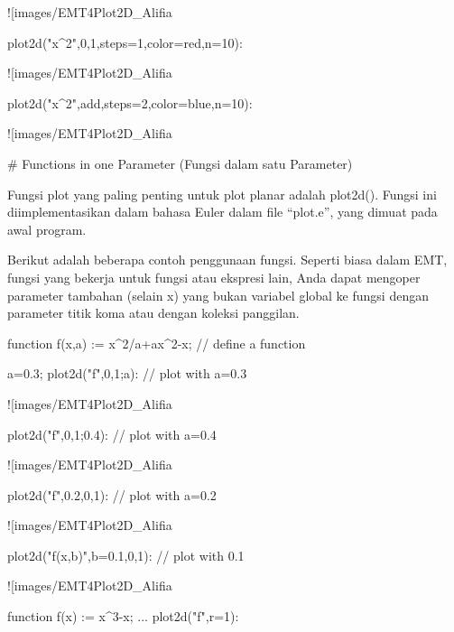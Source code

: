 \documentclass{article}
\begin{document}
![images/EMT4Plot2D_Alifia%

\>plot2d("x^2",0,1,steps=1,color=red,n=10):


![images/EMT4Plot2D_Alifia%

\>plot2d("x^2",\>add,steps=2,color=blue,n=10):


![images/EMT4Plot2D_Alifia%

# Functions in one Parameter (Fungsi dalam satu Parameter)

Fungsi plot yang paling penting untuk plot planar adalah plot2d().
Fungsi ini diimplementasikan dalam bahasa Euler dalam file “plot.e”,
yang dimuat pada awal program.


Berikut adalah beberapa contoh penggunaan fungsi. Seperti biasa dalam
EMT, fungsi yang bekerja untuk fungsi atau ekspresi lain, Anda dapat
mengoper parameter tambahan (selain x) yang bukan variabel global ke
fungsi dengan parameter titik koma atau dengan koleksi panggilan.


\>function f(x,a) := x^2/a+a\*x^2-x; // define a function

\>a=0.3; plot2d("f",0,1;a): // plot with a=0.3


![images/EMT4Plot2D_Alifia%

\>plot2d("f",0,1;0.4): // plot with a=0.4


![images/EMT4Plot2D_Alifia%

\>plot2d({{"f",0.2}},0,1): // plot with a=0.2


![images/EMT4Plot2D_Alifia%

\>plot2d({{"f(x,b)",b=0.1}},0,1): // plot with 0.1


![images/EMT4Plot2D_Alifia%

\>function f(x) := x^3-x; ...  
\>   plot2d("f",r=1):
\end{document}

